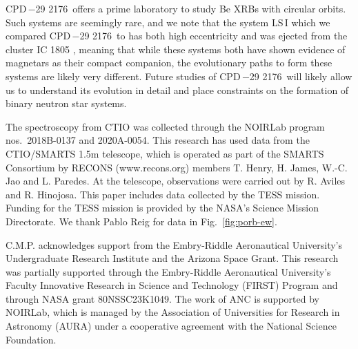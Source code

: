 \documentclass[]{aastex631}
\newcommand{\target}{CPD\,$-$29 2176}
\begin{document}
\target\ offers a prime laboratory to study Be XRBs with circular orbits. Such systems are seemingly rare, and we note that the system LS\,I which we compared \target\ to has both high eccentricity \citep{2009ApJ...707.1080A} and was ejected from the cluster IC 1805 \citep{2004A&A...422L..29M}, meaning that while these systems both have shown evidence of magnetars as their compact companion, the evolutionary paths to form these systems are likely very different. Future studies of \target\ will likely allow us to understand its evolution in detail and place constraints on the formation of binary neutron star systems.

  


The spectroscopy from CTIO was
collected through the NOIRLab program nos.\ 2018B-0137 and 2020A-0054. This research has
used data from the CTIO/SMARTS 1.5m telescope, which is operated as part of the SMARTS
Consortium by RECONS (www.recons.org) members T. Henry, H. James, W.-C. Jao and
L. Paredes. At the telescope, observations were carried out by R. Aviles and R. Hinojosa. This paper includes data collected by the TESS mission. Funding for the TESS mission is provided by the NASA's Science Mission Directorate.
We thank Pablo Reig for data in Fig.~\ref{fig:porb-ew}.

C.M.P. acknowledges support from the Embry-Riddle Aeronautical
University’s Undergraduate Research Institute and the Arizona Space Grant. This research was
partially supported through the Embry-Riddle Aeronautical University’s Faculty Innovative
Research in Science and Technology (FIRST) Program and through NASA grant 80NSSC23K1049. The work of ANC is supported by NOIRLab, which is managed by the Association of Universities for Research in Astronomy (AURA) under a cooperative agreement with the National Science Foundation.



\vspace{5mm}




{}


\clearpage

\end{document}
